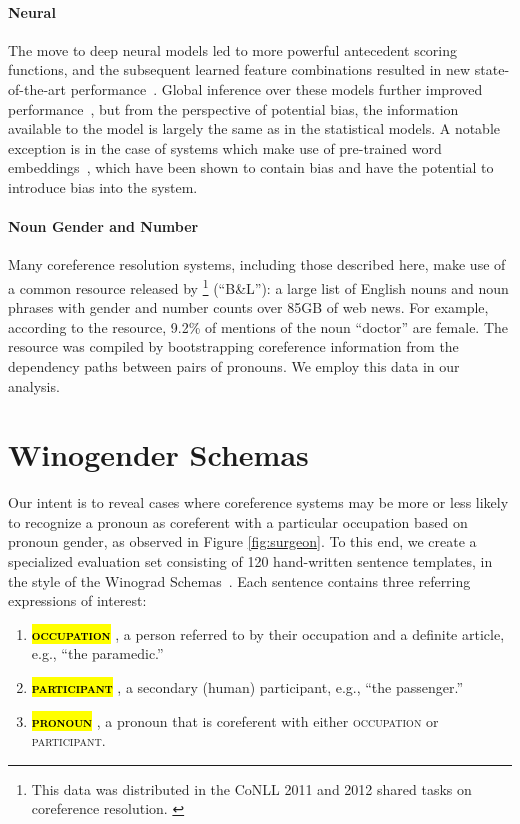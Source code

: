 \documentclass[11pt,a4paper]{article}
\newcommand{\hlc}[2][yellow]{ {\sethlcolor{#1} \hl{#2}} }
\begin{document}
\paragraph{Neural}

The move to deep neural models led to more powerful antecedent scoring functions, and the subsequent learned feature combinations resulted in new state-of-the-art performance~\citep{P15-1137, clark2016improving}.  Global inference over these models further improved performance~\citep{wiseman-rush-shieber:2016:N16-1, clark2016deep}, but from the perspective of potential bias, the information available to the model is largely the same as in the statistical models. A notable exception is in the case of systems which make use of pre-trained word embeddings~\citep{clark2016improving}, which have been shown to contain bias and have the potential to introduce bias into the system.


\paragraph{Noun Gender and Number}
Many coreference resolution systems, including those described here, make use of a common resource released by \footnote{This data was distributed in the CoNLL 2011 and 2012 shared tasks on coreference resolution. \cite{pradhan-etal-conll-st-2011-ontonotes,pradhan-etal-conll-st-2012-ontonotes}} (``B\&L''): a large list of English nouns and noun phrases with gender and number counts over 85GB of web news. For example, according to the resource, 9.2\% of mentions of the noun ``doctor'' are female. The resource was compiled by bootstrapping coreference information from the dependency paths between pairs of pronouns. We employ this data in our analysis.




\section{Winogender Schemas}
\label{sec:data}

Our intent is to reveal cases where coreference systems may be more or less likely to recognize a pronoun as coreferent with a particular occupation based on pronoun gender, as observed in Figure \ref{fig:surgeon}.
To this end, we create a specialized evaluation set consisting of 120 hand-written sentence templates, in the style of the Winograd Schemas~\cite{Levesque2011TheWS}. Each sentence contains three referring expressions of interest:
\begin{enumerate}
\item \hlc[bvd-green]{\textbf{\textsc{occupation}}}, a person referred to by their occupation and a definite article, e.g., ``the paramedic.''
\item \hlc[bvd-blue]{\textbf{\textsc{participant}}}, a secondary (human) participant, e.g., ``the passenger.''
\item \hlc[bvd-gray]{\textbf{\textsc{pronoun}}}, a pronoun that is coreferent with either \textsc{occupation} or \textsc{participant}.
\end{enumerate}
\end{document}
